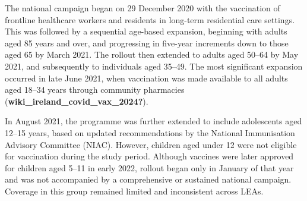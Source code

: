 \documentclass{article}
\begin{document}
The national campaign began on 29 December 2020 with the vaccination of
frontline healthcare workers and residents in long-term residential care
settings. This was followed by a sequential age-based expansion,
beginning with adults aged 85 years and over, and progressing in
five-year increments down to those aged 65 by March 2021. The rollout
then extended to adults aged 50--64 by May 2021, and subsequently to
individuals aged 35--49. The most significant expansion occurred in late
June 2021, when vaccination was made available to all adults aged 18--34
years through community pharmacies
(\textbf{wiki\_ireland\_covid\_vax\_2024?}).

In August 2021, the programme was further extended to include
adolescents aged 12--15 years, based on updated recommendations by the
National Immunisation Advisory Committee (NIAC). However, children aged
under 12 were not eligible for vaccination during the study period.
Although vaccines were later approved for children aged 5--11 in early
2022, rollout began only in January of that year and was not accompanied
by a comprehensive or sustained national campaign. Coverage in this
group remained limited and inconsistent across LEAs.
\end{document}
